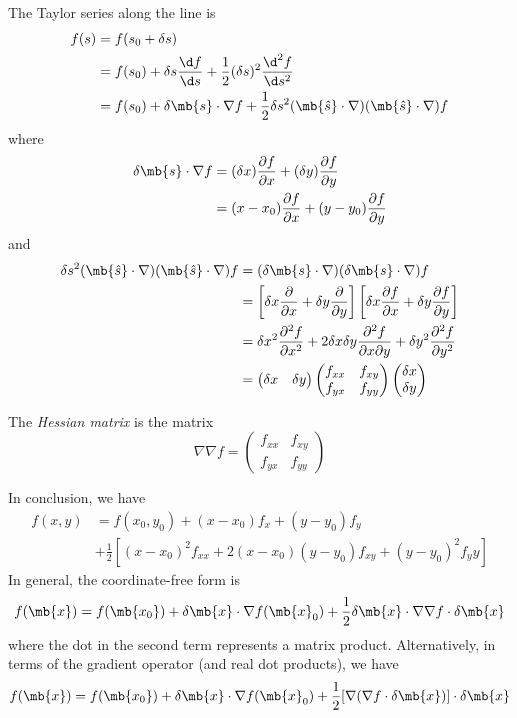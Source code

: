 \documentclass[a4paper]{article}
\begin{document}
The Taylor series along the line is
\begin{align*}
  f(s) &= f(s_0 + \delta s)\\
  &=f(s_0) + \delta s\frac{\d f}{\d s} + \frac{1}{2}(\delta s)^2\frac{\d ^2 f}{\d s^2}\\
  &= f(s_0) + \delta \mb{s} \cdot \nabla f + \frac{1}{2}\delta s^2 (\mb{\hat{s}}\cdot \nabla)(\mb{\hat{s}}\cdot \nabla)f
\end{align*}
where 
\begin{align*}
  \delta \mb{s}\cdot \nabla f &= (\delta x)\frac{\partial f}{\partial x} + (\delta y)\frac{\partial f}{\partial y}\\
  &= (x - x_0)\frac{\partial f}{\partial x} + (y - y_0)\frac{\partial f}{\partial y}
\end{align*}
and
\begin{align*}
  \delta s^2 (\mb{\hat{s}}\cdot \nabla)(\mb{\hat{s}}\cdot \nabla)f &= (\delta \mb{s}\cdot \nabla)(\delta \mb{s}\cdot \nabla) f\\
  &= \left[\delta x\frac{\partial }{\partial x} + \delta y\frac{\partial}{\partial y}\right]\left[\delta x\frac{\partial f}{\partial x} + \delta y\frac{\partial f}{\partial y}\right]\\
  &= \delta x^2 \frac{\partial^2 f}{\partial x^2} + 2\delta x\delta y\frac{\partial^2 f}{\partial x\partial y} + \delta y^2 \frac{\partial^2 f}{\partial y^2}\\
&= 
  \begin{pmatrix}
    \delta x& \delta y
  \end{pmatrix}
  \begin{pmatrix}
    f_{xx}&f_{xy}\\
    f_{yx}&f_{yy}
  \end{pmatrix}
  \begin{pmatrix}
    \delta x\\\delta y
  \end{pmatrix}
\end{align*}
\begin{defi}
  The \emph{Hessian matrix} is the matrix
\[
\nabla \nabla f =
\begin{pmatrix}
  f_{xx}&f_{xy}\\
  f_{yx}&f_{yy}
\end{pmatrix}
\]
\end{defi}

In conclusion, we have
\begin{align*}
  f(x, y) &= f(x_0, y_0) + (x - x_0)f_x + (y - y_0)f_y \\
  &+ \frac{1}{2}[(x - x_0)^2 f_{xx} + 2(x - x_0)(y - y_0)f_{xy} + (y - y_0)^2 f_yy]
\end{align*}
In general, the coordinate-free form is
\[
f(\mb{x}) = f(\mb{x_0}) + \delta \mb{x}\cdot\nabla f(\mb{x}_0) + \frac{1}{2}\delta \mb{x}\cdot \nabla \nabla f\cdot \delta \mb{x}
\]
where the dot in the second term represents a matrix product. Alternatively, in terms of the gradient operator (and real dot products), we have
\[
f(\mb{x}) = f(\mb{x_0}) + \delta \mb{x}\cdot \nabla f(\mb{x}_0) + \frac{1}{2}[\nabla (\nabla f\cdot \delta \mb{x})]\cdot \delta\mb{x}
\]
\end{document}
